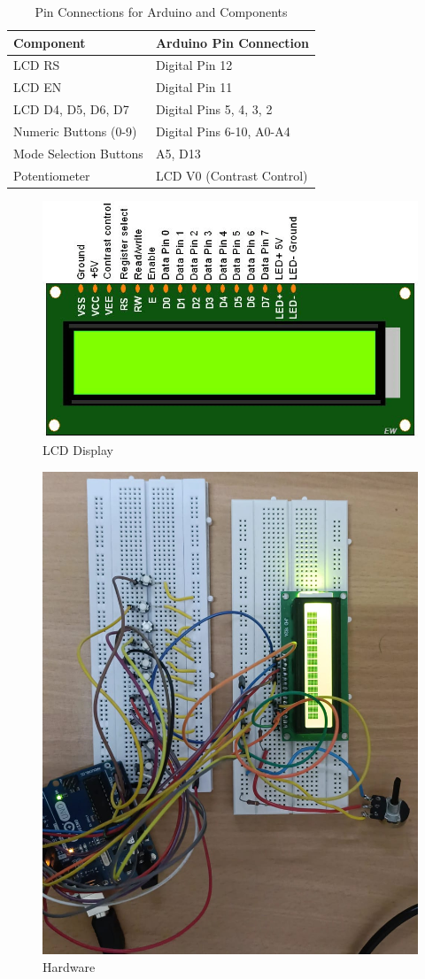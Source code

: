 \begin{table}[h]
\centering
\renewcommand{\arraystretch}{1.4} %
\begin{tabular}{|>{\raggedright\arraybackslash}m{5cm}|>{\raggedright\arraybackslash}m{5.5cm}|}
\hline
\textbf{Component} & \textbf{Arduino Pin Connection} \\
\hline
LCD RS & Digital Pin 12 \\
LCD EN & Digital Pin 11 \\
LCD D4, D5, D6, D7 & Digital Pins 5, 4, 3, 2 \\
Numeric Buttons (0-9) & Digital Pins 6-10, A0-A4 \\
Mode Selection Buttons & A5, D13 \\
Potentiometer & LCD V0 (Contrast Control) \\
\hline
\end{tabular}
\vspace{0.4cm}
\caption{Pin Connections for Arduino and Components}
\end{table}
\begin{figure}[H]
    \centering
    \includegraphics[width=0.5\linewidth]{1_LCD16x2_Pins.png}
    \caption{LCD Display}
    \label{fig:enter-label}
\end{figure}
\begin{figure}[H]
    \centering
    \includegraphics[width=0.5\linewidth]{WhatsApp Image 2025-03-24 at 19.40.29_df83bc3a.jpg}
    \caption{Hardware}
    \label{fig:enter-label}
\end{figure}